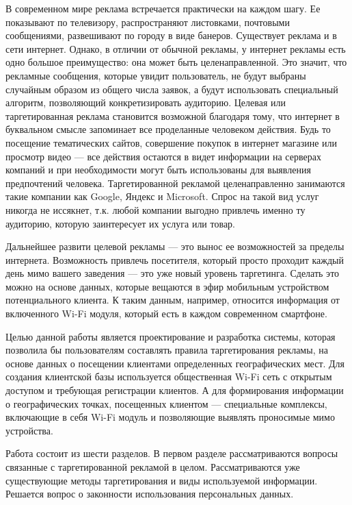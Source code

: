 \intro

В современном мире реклама встречается практически на каждом шагу. Ее показывают по телевизору, распространяют листовками, почтовыми сообщениями, развешивают по городу в виде банеров. Существует реклама и в сети интернет. Однако, в отличии от обычной рекламы, у интернет рекламы есть одно большое преимущество: она может быть целенаправленной. Это значит, что рекламные сообщения, которые увидит пользователь, не будут выбраны случайным образом из общего числа заявок, а будут использовать специальный алгоритм, позволяющий конкретизировать аудиторию. Целевая или таргетированная реклама становится возможной благодаря тому, что интернет в буквальном смысле запоминает все проделанные человеком действия. Будь то посещение тематических сайтов, совершение покупок в интернет магазине или просмотр видео --- все действия остаются в видет информации на серверах компаний и при необходимости могут быть использованы для выявления предпочтений человека. Таргетированной рекламой целенаправленно занимаются такие компании как Google, Яндекс и Microsoft. Спрос на такой вид услуг никогда не иссякнет, т.к. любой компании выгодно привлечь именно ту аудиторию, которую заинтересует их услуга или товар.

Дальнейшее развити целевой рекламы --- это вынос ее возможностей за пределы интернета. Возможность привлечь посетителя, который просто проходит каждый день мимо вашего заведения --- это уже новый уровень таргетинга. Сделать это можно на основе данных, которые вещаются в эфир мобильным устройством потенциального клиента. К таким данным, например, относится информация от включенного Wi-Fi модуля, который есть в каждом современном смартфоне. 

Целью данной работы является проектирование и разработка системы, которая позволила бы пользователям составлять правила таргетирования рекламы, на основе данных о посещении клиентами определенных географических мест. Для создания клиентской базы используется общественная Wi-Fi сеть с открытым доступом и требующая регистрации клиентов. А для формирования информации о географических точках, посещенных клиентом --- специальные комплексы, включающие в себя Wi-Fi модуль и позволяющие выявлять проносимые мимо устройства.

Работа состоит из шести разделов. В первом разделе рассматриваются вопросы связанные с таргетированной рекламой в целом. Рассматриваются уже существующие методы таргетирования и виды используемой информации. Решается вопрос о законности использования персональных данных.

